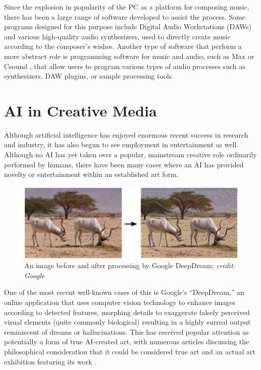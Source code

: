 \documentclass[ author={Stephen Livermore-Tozer},
				supervisor={Dr. Peter Flach},
				degree={MEng},
				title={Algorithmic Co-composition Using Machine Learning},
				subtitle={},
				type={research},
				year={2016} ]{dissertation}
\begin{document}
	Since the explosion in popularity of the PC as a platform for composing music, there has been a large range of software developed to assist the process. Some programs designed for this purpose include Digital Audio Workstations (DAWs) and various high-quality audio synthesizers, used to directly create music according to the composer's wishes. Another type of software that perform a more abstract role is programming software for music and audio, such as Max \cite{puckette2002max} or Csound \cite{boulanger2000csound}, that allow users to program various types of audio processes such as synthesizers, DAW plugins, or sample processing tools. 
	
	\section{AI in Creative Media}
	
	Although artificial intelligence has enjoyed enormous recent success in research and industry, it has also begun to see employment in entertainment as well. Although no AI has yet taken over a popular, mainstream creative role ordinarily performed by humans, there have been many cases where an AI has provided novelty or entertainment within an established art form.
	
	\begin{figure}[h]
		\centering
		\includegraphics[width=1.0\textwidth]{deep-dream-example}
		\caption{An image before and after processing by Google DeepDream; \textit{credit: Google}}
	\end{figure}
	
	One of the most recent well-known cases of this is Google's ``DeepDream,'' an online application that uses computer vision technology to enhance images according to detected features, morphing details to exaggerate falsely perceived visual elements (quite commonly biological) resulting in a highly surreal output reminiscent of dreams or hallucinations. This has received popular attention as potentially a form of true AI-created art, with numerous articles discussing the philosophical consideration that it could be considered true art \cite{rayner2016google,galperina2015google} and an actual art exhibition featuring its work \cite{campbell2016inside}.
	
\end{document}
